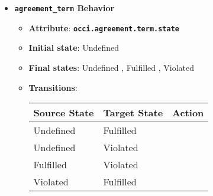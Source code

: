 \begin{itemize}
\item \textbf{\texttt{agreement\_term} Behavior}
\begin{itemize}
\item \textbf{Attribute}: \textbf{\texttt{occi.agreement.term.state}}
\item \textbf{Initial state}: Undefined
\item \textbf{Final states}:  	Undefined
, 	Fulfilled
, 	Violated
\item \textbf{Transitions}:

\begin{center}
\begin{tabular}{|l|l|l|}
  \hline
  \textbf{Source State} & \textbf{Target State} & \textbf{Action} \\
  \hline  
  Undefined & Fulfilled &   \\
  \hline
  Undefined & Violated &   \\
  \hline
  Fulfilled & Violated &   \\
  \hline
  Violated & Fulfilled &   \\
  \hline
\end{tabular}
\end{center}
\end{itemize}
\end{itemize}
 
